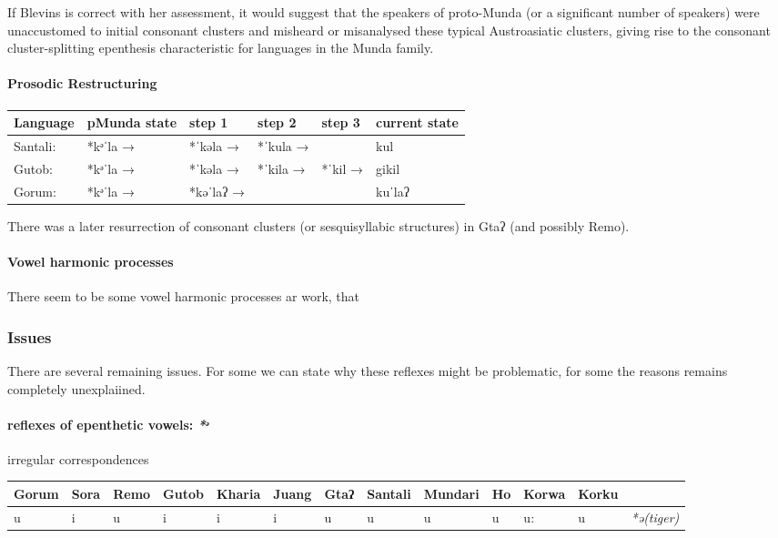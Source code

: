 \documentclass[a4paper,]{article}
\let\oldparagraph\paragraph
\renewcommand{\paragraph}[1]{\oldparagraph{#1}\mbox{}}
\begin{document}
If Blevins is correct with her assessment, it would suggest that the
speakers of proto-Munda (or a significant number of speakers) were
unaccustomed to initial consonant clusters and misheard or misanalysed
these typical Austroasiatic clusters, giving rise to the consonant
cluster-splitting epenthesis characteristic for languages in the Munda
family.

\paragraph{Prosodic Restructuring}\label{prosodic-restructuring}

\begin{longtable}[]{@{}llllll@{}}
\toprule
Language & pMunda state & step 1 & step 2 & step 3 & current
state\tabularnewline
\midrule
\endhead
Santali: & *kᵊˈla → & *ˈkəla → & *ˈkula → & & kul\tabularnewline
Gutob: & *kᵊˈla → & *ˈkəla → & *ˈkila → & *ˈkil → & gikil\tabularnewline
Gorum: & *kᵊˈla → & *kəˈlaʔ → & & & kuˈlaʔ\tabularnewline
\bottomrule
\end{longtable}

There was a later resurrection of consonant clusters (or sesquisyllabic
structures) in Gtaʔ (and possibly Remo).

\paragraph{Vowel harmonic processes}\label{vowel-harmonic-processes}

There seem to be some vowel harmonic processes ar work, that

\subsubsection{Issues}\label{issues}

There are several remaining issues. For some we can state why these
reflexes might be problematic, for some the reasons remains completely
unexplaiined.

\paragraph{\texorpdfstring{reflexes of epenthetic vowels:
\emph{*ᵊ}}{reflexes of epenthetic vowels: *ᵊ}}\label{reflexes-of-epenthetic-vowels-ux1d4a}

irregular correspondences

\begin{longtable}[]{@{}lllllllllllll@{}}
\toprule
Gorum & Sora & Remo & Gutob & Kharia & Juang & Gtaʔ & Santali & Mundari
& Ho & Korwa & Korku &\tabularnewline
\midrule
\endhead
u & i & u & i & i & i & u & u & u & u & u: & u &
\emph{*ə(tiger)}\tabularnewline
\bottomrule
\end{longtable}
\end{document}
